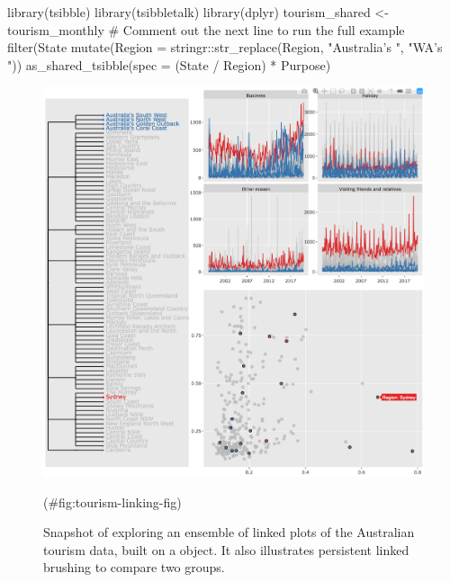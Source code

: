 \begin{Schunk}
\begin{Sinput}
library(tsibble)
library(tsibbletalk)
library(dplyr)
tourism_shared <- tourism_monthly %
  # Comment out the next line to run the full example
  filter(State %
  mutate(Region = stringr::str_replace(Region, "Australia's ", "WA's ")) %
  as_shared_tsibble(spec = (State / Region) * Purpose)
\end{Sinput}
\end{Schunk}

\begin{Schunk}
\begin{figure}

{\centering \includegraphics[width=\textwidth]{img/tourism-linking} 

}

\caption[Snapshot of exploring an ensemble of linked plots of the Australian tourism data, built on a  object]{Snapshot of exploring an ensemble of linked plots of the Australian tourism data, built on a  object. It also illustrates persistent linked brushing to compare two groups.}(\#fig:tourism-linking-fig)
\end{figure}
\end{Schunk}

